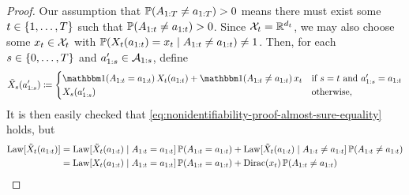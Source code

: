 \begin{proof}
    Our assumption that $\mathbb{P}(A_{1:T} \neq a_{1:T}) > 0$ means there must exist some $t \in \{1, \ldots, T\}$ such that $\mathbb{P}(A_{1:t} \neq a_{1:t}) > 0$.
    Since $\mathcal{X}_t = \mathbb{R}^{d_t}$, we may also choose some $x_t \in \mathcal{X}_t$ with $\mathbb{P}(X_t(a_{1:t}) = x_t \mid A_{1:t} \neq a_{1:t}) \neq 1$.
    Then, for each $s \in \{0, \ldots, T\}$ and $a_{1:s}' \in \mathcal{A}_{1:s}$, define
    \[
         \tilde{\X}_{\sx}(\ax_{1:\sx}') \coloneqq \begin{cases}
            \ind(\A_{1:\tx} = \ax_{1:\tx}) \, \X_{\tx}(\ax_{1:\tx}) + \ind(\A_{1:\tx} \neq \ax_{1:\tx}) \, \xx_\tx & \text{if $\sx = \tx$ and $\ax_{1:\sx}' = \ax_{1:\tx}$} \\
            \X_{\sx}(\ax_{1:\sx}') & \text{otherwise},
         \end{cases}
    \]
    It is then easily checked that \eqref{eq:nonidentifiability-proof-almost-sure-equality} holds, but
    \begin{align*}
        \Law[\tilde{\X}_{\tx}(\ax_{1:\tx})] &= \Law[\tilde{\X}_{\tx}(\ax_{1:\tx}) \mid \A_{1:\tx} = \ax_{1:\tx}] \, \Prob(\A_{1:\tx} = \ax_{1:\tx}) + \Law[\tilde{\X}_{\tx}(\ax_{1:\tx}) \mid \A_{1:\tx} \neq \ax_{1:\tx}] \, \Prob(\A_{1:\tx} \neq \ax_{1:\tx}) \\
        &= \Law[X_{\tx}(\ax_{1:\tx}) \mid \A_{1:\tx} = \ax_{1:\tx}] \, \Prob(\A_{1:\tx} = \ax_{1:\tx}) + \mathrm{Dirac}(\xx_\tx) \, \Prob(\A_{1:\tx} \neq \ax_{1:\tx}) \\

\end{align*}
\end{proof}
